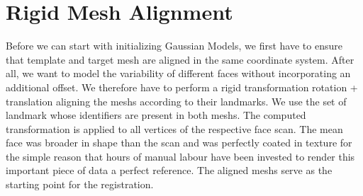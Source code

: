 \section{Rigid Mesh Alignment}
Before we can start with initializing Gaussian Models, we first have to ensure that template and target mesh are aligned in the same coordinate system. After all, we want to model the variability of different faces without incorporating an additional offset. We therefore have to perform a rigid transformation  
rotation + translation
aligning the meshs according to their landmarks.  We use the set of landmark whose identifiers are present in both meshs.
The computed transformation is applied to all vertices of the respective face scan. 
The mean face was broader in shape than the scan and was perfectly coated in texture for the simple reason that hours of manual labour have been invested to render this important piece of data a perfect reference.
The aligned meshs serve as the starting point for the registration.

